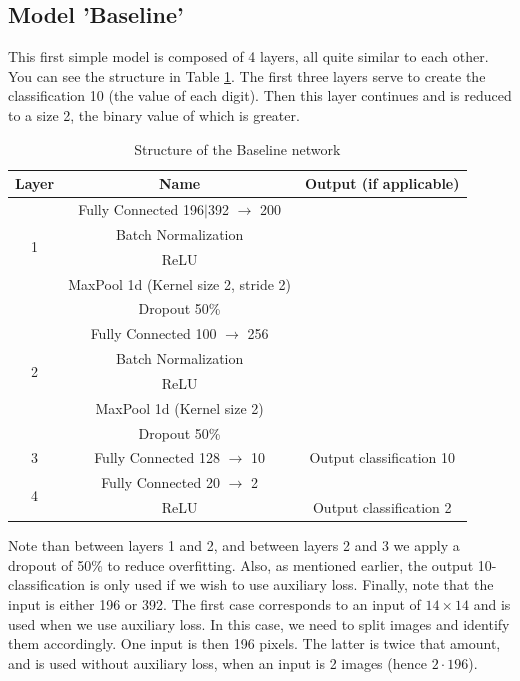 \documentclass[10pt,conference]{IEEEtran}
\begin{document}
\subsection{Model 'Baseline'}
This first simple model is composed of 4 layers, all quite similar to each other. You can see the structure in Table \ref{tab:structure_baseline}. The first three layers serve to create the classification 10 (the value of each digit). Then this layer continues and is reduced to a size 2, the binary value of which is greater.
\begin{table}
    \begin{tabular}{c|c||c}
        Layer & Name & Output (if applicable)\\
        \hline\hline
        \multirow{4}{*}{1} & Fully Connected 196$|$392 $\to$ 200\\
        & Batch Normalization\\
        & ReLU\\
        & MaxPool 1d (Kernel size 2, stride 2)\\
        \hline
        \multicolumn{1}{c}{} & Dropout 50\% & \\
        \hline
        \multirow{4}{*}{2} & Fully Connected 100 $\to$ 256\\
        & Batch Normalization\\
        & ReLU\\
        & MaxPool 1d (Kernel size 2)\\
        \hline
        \multicolumn{1}{c}{} & Dropout 50\% & \\
        \hline
        3 & Fully Connected 128 $\to$ 10 & Output classification 10\\
        \hline
        \multirow{2}{*}{4} & Fully Connected 20 $\to$ 2\\
        & ReLU & Output classification 2
    \end{tabular}
    \caption{Structure of the Baseline network}
    \label{tab:structure_baseline}
\end{table}
Note than between layers 1 and 2, and between layers 2 and 3 we apply a dropout of 50\% to reduce overfitting. Also, as mentioned earlier, the output 10-classification is only used if we wish to use auxiliary loss. Finally, note that the input is either 196 or 392. The first case corresponds to an input of $14 \times 14$ and is used when we use auxiliary loss. In this case, we need to split images and identify them accordingly. One input is then 196 pixels. The latter is twice that amount, and is used without auxiliary loss, when an input is 2 images (hence $2\cdot 196$).
\end{document}
